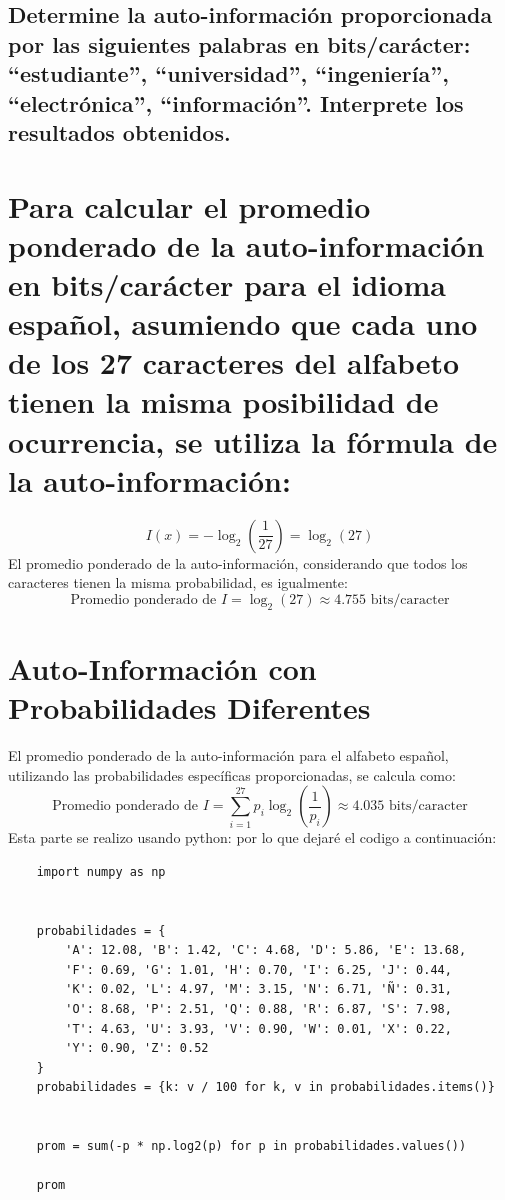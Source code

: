 \documentclass[
  11pt,
  letterpaper,
  answers
]{exam}
\begin{document}
\begin{questions}
\begin{parts}
    \part{Determine la auto-información proporcionada por las siguientes palabras en bits/carácter: ``estudiante'', ``universidad'', ``ingeniería'', ``electrónica'', ``información''. Interprete los resultados obtenidos.}
\end{parts}
\begin{solution}
\begin{parts}
\part{Para calcular el promedio ponderado de la auto-información en bits/carácter para el idioma español, asumiendo que cada uno de los 27 caracteres del alfabeto tienen la misma posibilidad de ocurrencia, se utiliza la fórmula de la auto-información:}
\[
I(x) = -\log_2\left(\frac{1}{27}\right) = \log_2(27)
\]
El promedio ponderado de la auto-información, considerando que todos los caracteres tienen la misma probabilidad, es igualmente:
\[
\text{Promedio ponderado de } I = \log_2(27) \approx 4.755 \text{ bits/caracter}
\]
\part{Auto-Información con Probabilidades Diferentes}
El promedio ponderado de la auto-información para el alfabeto español, utilizando las probabilidades específicas proporcionadas, se calcula como:
\[
\text{Promedio ponderado de } I = \sum_{i=1}^{27} p_i \log_2 \left(\frac{1}{p_i}\right) \approx 4.035 \text{ bits/caracter}
\]
Esta parte se realizo usando python: por lo que dejaré el codigo a continuación:
\begin{verbatim}
    import numpy as np

    
    probabilidades = {
        'A': 12.08, 'B': 1.42, 'C': 4.68, 'D': 5.86, 'E': 13.68,
        'F': 0.69, 'G': 1.01, 'H': 0.70, 'I': 6.25, 'J': 0.44,
        'K': 0.02, 'L': 4.97, 'M': 3.15, 'N': 6.71, 'Ñ': 0.31,
        'O': 8.68, 'P': 2.51, 'Q': 0.88, 'R': 6.87, 'S': 7.98,
        'T': 4.63, 'U': 3.93, 'V': 0.90, 'W': 0.01, 'X': 0.22,
        'Y': 0.90, 'Z': 0.52
    }
    probabilidades = {k: v / 100 for k, v in probabilidades.items()}
    
    
    prom = sum(-p * np.log2(p) for p in probabilidades.values())
    
    prom
\end{verbatim}    

\end{parts}
\end{solution}
\end{questions}
\end{document}
